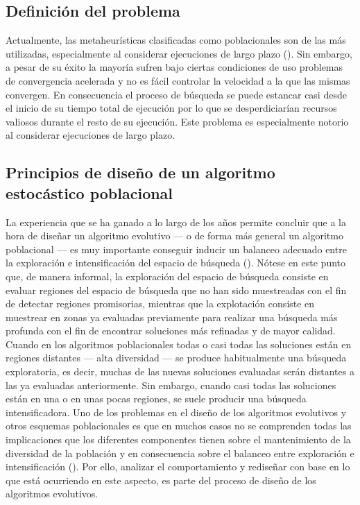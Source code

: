 \subsection{Definición del problema}

Actualmente, las metaheurísticas clasificadas como poblacionales son de las más utilizadas, especialmente
al considerar ejecuciones de largo plazo (\cite{glover2005handbook}).
%
Sin embargo, a pesar de su éxito la mayoría sufren bajo ciertas condiciones de uso problemas de convergencia acelerada
y no es fácil controlar la velocidad a la que las mismas convergen.
%
En consecuencia el proceso de búsqueda se puede estancar casi desde el inicio de su tiempo total de ejecución por lo que
se desperdiciarían recursos valiosos durante el resto de su ejecución.
%
Este problema es especialmente notorio al considerar ejecuciones de largo plazo.

\subsection{Principios de diseño de un algoritmo estocástico poblacional}

La experiencia que se ha ganado a lo largo de los años permite concluir que a la hora de diseñar 
un algoritmo evolutivo --- o de forma más general un algoritmo poblacional --- es muy importante conseguir inducir un balanceo 
adecuado entre la exploración e intensificación del espacio de búsqueda (\cite{herrera1996adaptation}).
%
Nótese en este punto que, de manera informal, la exploración del espacio de búsqueda consiste en evaluar regiones del espacio 
de búsqueda que no han sido muestreadas con el fin de detectar regiones promisorias, mientras que la explotación consiste en 
muestrear en zonas ya evaluadas previamente para realizar una búsqueda más profunda con el fin de encontrar soluciones más 
refinadas y de mayor calidad.
%
Cuando en los algoritmos poblacionales todas o casi todas las soluciones están en regiones distantes --- alta diversidad --- se 
produce habitualmente una búsqueda exploratoria, es decir, muchas de las nuevas soluciones evaluadas serán distantes a las ya 
evaluadas anteriormente.
%
Sin embargo, cuando casi todas las soluciones están en una o en unas pocas regiones, se suele producir 
una búsqueda intensificadora.
%
Uno de los problemas en el diseño de los algoritmos evolutivos y otros esquemas poblacionales es que en muchos casos no se 
comprenden todas las implicaciones que los diferentes componentes tienen sobre el mantenimiento de la diversidad de la población 
y en consecuencia sobre el balanceo entre exploración e intensificación (\cite{Crepinsek:13}).
%
Por ello, analizar el comportamiento y rediseñar con base en lo que está ocurriendo en este aspecto, es parte del proceso de 
diseño de los algoritmos evolutivos.

